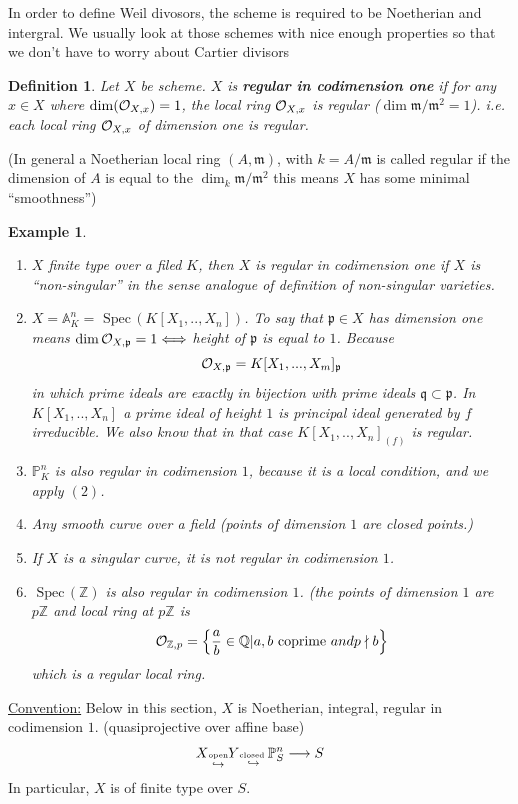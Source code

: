 \documentclass[11pt]{article}
\newtheorem{dfn}[thm]{Definition}
\newtheorem{ex}[thm]{Example}
\newcommand{\spec}{\text{ Spec}\,}
\newcommand{\affn}{\mathbb A}
\newcommand{\proj}{\mathbb P}
\newcommand{\intg}{\mathbb Z}
\newcommand{\ratl}{\mathbb Q}
\newcommand{\scm}{{\mathfrak m}}
\newcommand{\scp}{{\mathfrak p}}
\newcommand{\scq}{\mathfrak q}
\newcommand{\calo}{{\cal O}}
\newcommand{\lrta}{\longrightarrow}
\newcommand{\Llrta}{\Longleftrightarrow}
\newcommand{\inj}{\hookrightarrow}
\begin{document}
In order to define Weil divosors, the scheme is required to be Noetherian and intergral. We usually look at those schemes with nice enough properties so that we don't have to worry about Cartier divisors
\begin{dfn}
Let $X$ be scheme. $X$ is \textbf{regular in codimension one} if for any $x\in X$ where $\dim(\calo_{X,x})=1$, the local ring $\calo_{X,x}$ is regular ($\dim \scm/\scm^2=1$). i.e. each local ring $\calo_{X,x}$ of dimension one is regular.
\end{dfn}
(In general a Noetherian local ring $(A,\scm)$, with $k=A/\scm$ is called regular if the dimension of $A$ is equal to the $\dim_k \scm/\scm^2$  this means $X$ has some minimal ``smoothness'')
\begin{ex}
\ \begin{enumerate}[label=(\arabic*)]
\item $X$ finite type over a filed $K$, then $X$ is regular in codimension one  if $X$ is ``non-singular'' in the sense analogue of definition of non-singular varieties.
\item $X=\affn_K^n=\spec(K[X_1,..,X_n])$. To say that $\scp\in X$ has dimension one means $\dim \calo_{X,\scp}=1\Llrta $ height of $\scp$ is equal to $1$. Because
$$
\calo_{X,\scp}=K[X_1,...,X_m]_{\scp} 
$$
in which prime ideals are exactly in bijection with prime ideals $\scq\subset \scp$. In $K[X_1,..,X_n]$ a prime ideal of height $1$ is principal ideal generated by $f$ irreducible. We also know that in that case $K[X_1,..,X_n]_{(f)}$ is regular.
\item $\proj^n_K$ is also regular in codimension $1$, because it is a local condition, and we apply $(2)$.
\item Any smooth curve over a field (points of dimension $1$ are closed points.)
\item If $X$ is a singular curve, it is not regular in codimension $1$.
\item $\spec(\intg)$ is also regular in codimension $1$. (the points of dimension $1$ are $p\intg$ and local ring  at $p\intg$ is 
$$
\calo_{\intg,p}=\left\{\frac{a}{b}\in \ratl| a,b \text{ coprime } and p\nmid b\right\}
$$
which is a regular local ring.
\end{enumerate}
\end{ex}
\underline{Convention:} Below in this section, $X$ is Noetherian, integral, regular in codimension $1$. (quasiprojective over affine base)
$$
X\underset{\inj}{\text{\tiny open}} Y\underset{\inj}{\text{\tiny closed }} \proj^n_S\lrta S
$$
In particular, $X$ is of finite type over $S$.
\end{document}
